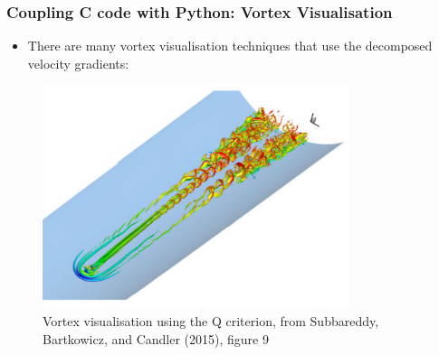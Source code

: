 \documentclass[landscape,10pt]{beamer}
\begin{document}
\begin{frame}[fragile]
\frametitle{Coupling C code with Python: Vortex Visualisation}
\begin{itemize}
\item There are many vortex visualisation techniques that use the decomposed velocity gradients:
\end{itemize}



\begin{figure}[h]
    \tiny
    \centering
    \includegraphics[width=0.80\textwidth]{candler_fig9b.png}
    \caption{Vortex visualisation using the Q criterion, from Subbareddy, Bartkowicz, and Candler (2015), figure 9} 
    \label{candler_fig9b}
\end{figure}

\end{frame}
\end{document}
